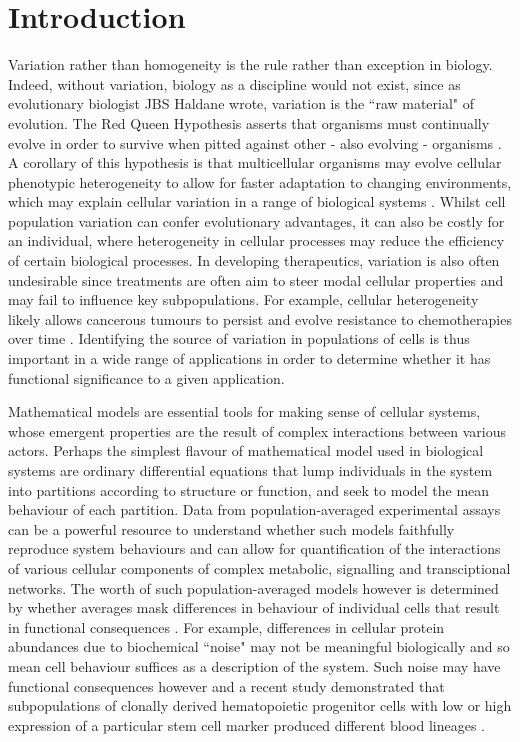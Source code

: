 \documentclass[10pt,letterpaper]{article}
\begin{document}
\section{Introduction}
Variation rather than homogeneity is the rule rather than exception in biology. Indeed, without variation, biology as a discipline would not exist, since as evolutionary biologist JBS Haldane wrote, variation is the ``raw material" of evolution. The Red Queen Hypothesis asserts that organisms must continually evolve in order to survive when pitted against other - also evolving - organisms \cite{ridley1994red}. A corollary of this hypothesis is that multicellular organisms may evolve cellular phenotypic heterogeneity to allow for faster adaptation to changing environments, which may explain cellular variation in a range of biological systems \cite{fraser2009chance}. Whilst cell population variation can confer evolutionary advantages, it can also be costly for an individual, where heterogeneity in cellular processes may reduce the efficiency of certain biological processes. In developing therapeutics, variation is also often undesirable since treatments are often aim to steer modal cellular properties and may fail to influence key subpopulations. For example, cellular heterogeneity likely allows cancerous tumours to persist \cite{gatenby2007cellular} and evolve resistance to chemotherapies over time \cite{altrock2015mathematics}. Identifying the source of variation in populations of cells is thus important in a wide range of applications in order to determine whether it has functional significance to a given application.

Mathematical models are essential tools for making sense of cellular systems, whose emergent properties are the result of complex interactions between various actors. Perhaps the simplest flavour of mathematical model used in biological systems are ordinary differential equations that lump individuals in the system into partitions according to structure or function, and seek to model the mean behaviour of each partition. Data from population-averaged experimental assays can be a powerful resource to understand whether such models faithfully reproduce system behaviours and can allow for quantification of the interactions of various cellular components of complex metabolic, signalling and transciptional networks. The worth of such population-averaged models however is determined by whether averages mask differences in behaviour of individual cells that result in functional consequences \cite{altschuler2010cellular}. For example, differences in cellular protein abundances due to biochemical ``noise" may not be meaningful biologically \cite{elowitz2002stochastic} and so mean cell behaviour suffices as a description of the system. Such noise may have functional consequences however and a recent study demonstrated that subpopulations of clonally derived hematopoietic progenitor cells with low or high expression of a particular stem cell marker produced different blood lineages \cite{chang2008transcriptome}. 
\end{document}
